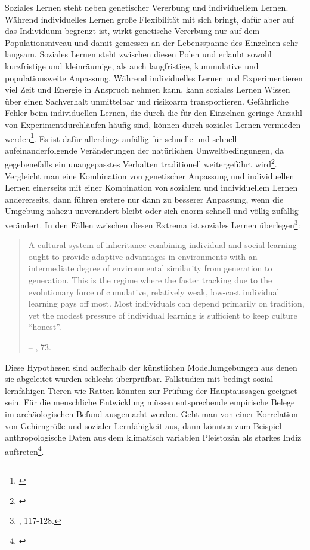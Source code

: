 \documentclass[openany,twoside,twocolumn]{book}
\let\rmarkdownfootnote\footnote%
\def\footnote{\protect\rmarkdownfootnote}
\begin{document}
Soziales Lernen steht neben genetischer Vererbung und individuellem
Lernen. Während individuelles Lernen große Flexibilität mit sich bringt,
dafür aber auf das Individuum begrenzt ist, wirkt genetische Vererbung
nur auf dem Populationsniveau und damit gemessen an der Lebensspanne des
Einzelnen sehr langsam. Soziales Lernen steht zwischen diesen Polen und
erlaubt sowohl kurzfristige und kleinräumige, als auch langfristige,
kummulative und populationsweite Anpassung. Während individuelles Lernen
und Experimentieren viel Zeit und Energie in Anspruch nehmen kann, kann
soziales Lernen Wissen über einen Sachverhalt unmittelbar und risikoarm
transportieren. Gefährliche Fehler beim individuellen Lernen, die durch
die für den Einzelnen geringe Anzahl von Experimentdurchläufen häufig
sind, können durch soziales Lernen vermieden werden\footnote{\textcite{boyd_evolution_1988}}.
Es ist dafür allerdings anfällig für schnelle und schnell
aufeinanderfolgende Veränderungen der natürlichen Umweltbedingungen, da
gegebenefalls ein unangepasstes Verhalten traditionell weitergeführt
wird\footnote{\textcite{rogers_does_1988}}. Vergleicht man eine
Kombination von genetischer Anpassung und individuellen Lernen
einerseits mit einer Kombination von sozialem und individuellem Lernen
andererseits, dann führen erstere nur dann zu besserer Anpassung, wenn
die Umgebung nahezu unverändert bleibt oder sich enorm schnell und
völlig zufällig verändert. In den Fällen zwischen diesen Extrema ist
soziales Lernen überlegen\footnote{\textcite{boyd_culture_1985},
  117-128.}:

\begin{quote}
A cultural system of inheritance combining individual and social
learning ought to provide adaptive advantages in environments with an
intermediate degree of environmental similarity from generation to
generation. This is the regime where the faster tracking due to the
evolutionary force of cumulative, relatively weak, low-cost individual
learning pays off most. Most individuals can depend primarily on
tradition, yet the modest pressure of individual learning is sufficient
to keep culture ``honest''.

-- \textcite{smith_cultural_1992}, 73.
\end{quote}

Diese Hypothesen sind außerhalb der künstlichen Modellumgebungen aus
denen sie abgeleitet wurden schlecht überprüfbar. Fallstudien mit
bedingt sozial lernfähigen Tieren wie Ratten könnten zur Prüfung der
Hauptaussagen geeignet sein. Für die menschliche Entwicklung müssen
entsprechende empirische Belege im archäologischen Befund ausgemacht
werden. Geht man von einer Korrelation von Gehirngröße und sozialer
Lernfähigkeit aus, dann könnten zum Beispiel anthropologische Daten aus
dem klimatisch variablen Pleistozän als starkes Indiz
auftreten\footnote{\textcite{smith_cultural_1992}}.
\end{document}
